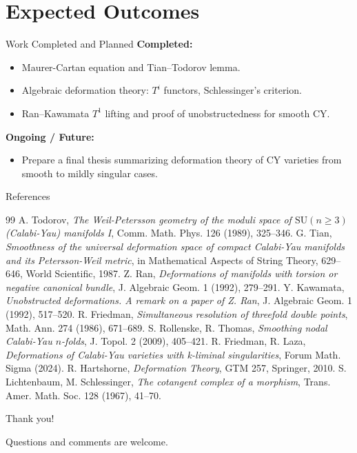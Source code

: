\documentclass{beamer}
\theoremstyle{definition}
\theoremstyle{plain}
\begin{document}
\section{Expected Outcomes}

\begin{frame}{Work Completed and Planned}
    \textbf{Completed:}
    \begin{itemize}
        \item Maurer-Cartan equation and Tian–Todorov lemma.
        \item Algebraic deformation theory: $T^i$ functors, Schlessinger's criterion.
        \item Ran–Kawamata $T^1$ lifting and proof of unobstructedness for smooth CY.
    \end{itemize}
    \pause
    \textbf{Ongoing / Future:}
    \begin{itemize}
        \item Prepare a final thesis summarizing deformation theory of CY varieties from smooth to mildly singular cases.
    \end{itemize}
\end{frame}

\begin{frame}[allowframebreaks]{References}
    \begin{thebibliography}{99}
         A. Todorov, \textit{The Weil-Petersson geometry of the moduli space of $\mathrm{SU}(n\ge 3)$ (Calabi-Yau) manifolds I}, Comm. Math. Phys. 126 (1989), 325--346.
         G. Tian, \textit{Smoothness of the universal deformation space of compact Calabi-Yau manifolds and its Petersson-Weil metric}, in Mathematical Aspects of String Theory, 629--646, World Scientific, 1987.
         Z. Ran, \textit{Deformations of manifolds with torsion or negative canonical bundle}, J. Algebraic Geom. 1 (1992), 279--291.
         Y. Kawamata, \textit{Unobstructed deformations. A remark on a paper of Z. Ran}, J. Algebraic Geom. 1 (1992), 517--520.
         R. Friedman, \textit{Simultaneous resolution of threefold double points}, Math. Ann. 274 (1986), 671--689.
         S. Rollenske, R. Thomas, \textit{Smoothing nodal Calabi-Yau $n$-folds}, J. Topol. 2 (2009), 405--421.
         R. Friedman, R. Laza, \textit{Deformations of Calabi-Yau varieties with k-liminal singularities}, Forum Math. Sigma (2024).
         R. Hartshorne, \textit{Deformation Theory}, GTM 257, Springer, 2010.
         S. Lichtenbaum, M. Schlessinger, \textit{The cotangent complex of a morphism}, Trans. Amer. Math. Soc. 128 (1967), 41--70.
    \end{thebibliography}
\end{frame}

\begin{frame}
    \centering
    \Huge{Thank you!}
    
    \vspace{1cm}
    \large{Questions and comments are welcome.}
\end{frame}
\end{document}
